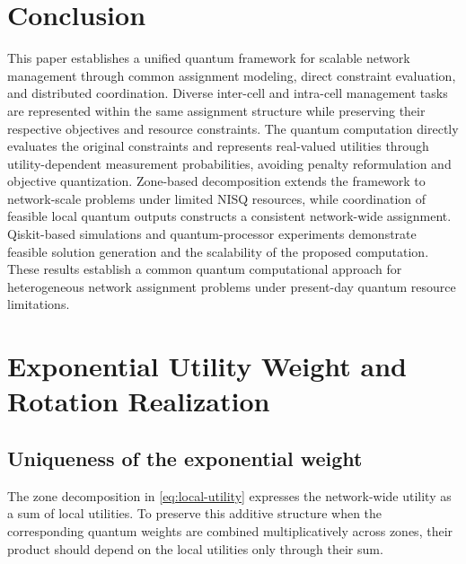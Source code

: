\documentclass[journal]{IEEEtran}
\begin{document}
{\color{purple}
\section{Conclusion}
\label{sec:conclusion}

This paper establishes a unified quantum framework for scalable network management through common assignment modeling, direct constraint
evaluation, and distributed coordination. Diverse inter-cell and intra-cell management tasks are represented within the same assignment
structure while preserving their respective objectives and resource constraints. The quantum computation directly evaluates the original
constraints and represents real-valued utilities through utility-dependent measurement probabilities, avoiding penalty reformulation and objective quantization. Zone-based decomposition extends the framework to network-scale problems under limited NISQ resources, while coordination of feasible local quantum outputs constructs a consistent network-wide assignment. Qiskit-based simulations and quantum-processor experiments demonstrate feasible solution generation and the scalability of the proposed computation. These results establish a common quantum computational approach for heterogeneous network assignment problems under present-day quantum resource limitations.

\appendices

\section{Exponential Utility Weight and Rotation Realization}
\label{app:exponential}

\subsection{Uniqueness of the exponential weight}
The zone decomposition in \eqref{eq:local-utility} expresses the network-wide utility as a sum of local utilities. To preserve this additive structure when the corresponding quantum weights are combined multiplicatively across zones, their product should depend on the local utilities only through their sum.

}
\end{document}
